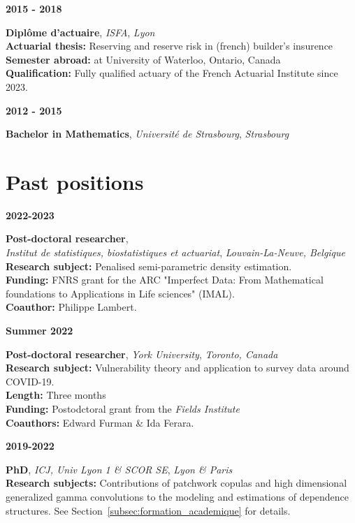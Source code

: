 \documentclass[a4paper,11pt]{article}
\newcommand{\tabcv}[2]{
\begin{minipage}[t]{0.12\linewidth}
\textbf{\footnotesize #1}
\end{minipage}\hfill
\begin{minipage}[t]{0.85\linewidth}
#2
\end{minipage}
\vspace{1em}
}
\newcommand{\bull}[1]{\textbf{#1}}
\begin{document}
\tabcv{2015 - 2018}{
\textbf{Diplôme d'actuaire}, \textit{ISFA}, \textit{Lyon}\\[0.5em]
{\footnotesize 
  \bull{Actuarial thesis:} Reserving and reserve risk in (french) builder's insurence\\
  \bull{Semester abroad:} at University of Waterloo, Ontario, Canada\\
  \bull{Qualification:} Fully qualified actuary of the French Actuarial Institute since 2023. 
}
}

\tabcv{2012 - 2015}{
\textbf{Bachelor in Mathematics}, \textit{Université de Strasbourg}, \textit{Strasbourg}\\[0.5em]
}

\section{Past positions}

\tabcv{2022-2023}{
\textbf{Post-doctoral researcher}, \\
\textit{Institut de statistiques, biostatistiques et actuariat}, \textit{Louvain-La-Neuve, Belgique}\\[0.5em]
{\footnotesize
  \bull{Research subject:} Penalised semi-parametric density estimation.\\
  \bull{Funding:} FNRS grant for the ARC "Imperfect Data:
  From Mathematical foundations to Applications in Life sciences" (IMAL).\\
  \bull{Coauthor:} Philippe Lambert.
}
}


\tabcv{Summer 2022}{
\textbf{Post-doctoral researcher}, \textit{York University}, \textit{Toronto, Canada}\\[0.5em]
{\footnotesize
  \bull{Research subject:} Vulnerability theory and application to survey data around COVID-19. \\
  \bull{Length:} Three months\\
  \bull{Funding:} Postodctoral grant from the \textit{Fields Institute}\\
  \bull{Coauthors:} Edward Furman \& Ida Ferara.
}
}


\tabcv{2019-2022}{
\textbf{PhD}, \textit{ICJ, Univ Lyon 1 \& SCOR SE}, \textit{Lyon \& Paris}\\[0.5em]
{\footnotesize
  \bull{Research subjects:} Contributions of patchwork copulas and high dimensional generalized gamma convolutions to the modeling and estimations of dependence structures. See Section~\ref{subsec:formation_academique} for details.
}
}
\end{document}

